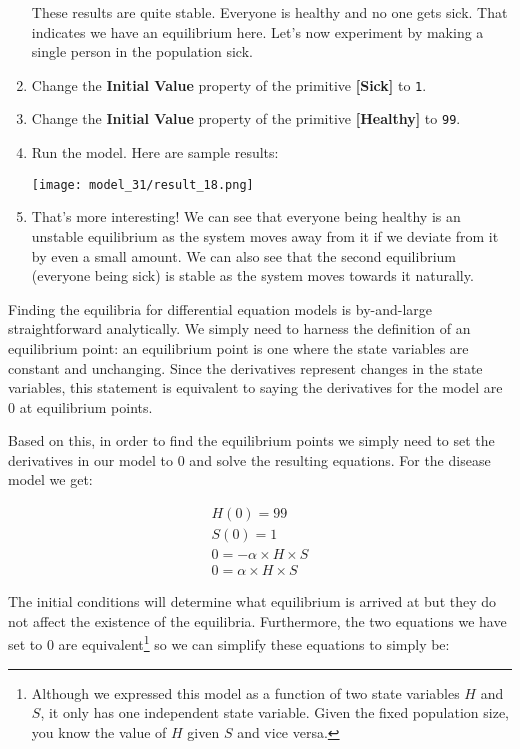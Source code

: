\documentclass[]{memoir}
\makeatletter
\def\maxwidth{\ifdim\Gin@nat@width>\linewidth\linewidth
\else\Gin@nat@width\fi}
\let\Oldincludegraphics\includegraphics
\renewcommand{\includegraphics}[1]{\Oldincludegraphics[width=\maxwidth]{#1}}
\newcommand{\p}[1]{\textbf{{[}#1{]}}}
\newcommand{\e}[1]{\texttt{#1}}
\renewcommand{\a}[1]{\textbf{#1}}
\makeatother
\begin{document}
\begin{oframed}
\begin{enumerate}
These results are quite stable. Everyone is healthy and no one gets sick. That indicates we have an equilibrium here. Let's now experiment by making a single person in the population sick.


\item  Change the \a{Initial Value} property of the primitive \p{Sick} to \e{1}.
\item  Change the \a{Initial Value} property of the primitive \p{Healthy} to \e{99}.
\item Run the model. Here are sample results:\par \begin{minipage}{\linewidth}  \centering \texttt{[image: model\_31/result\_18.png]}
\end{minipage}
\item 

That's more interesting! We can see that everyone being healthy is an unstable equilibrium as the system moves away from it if we deviate from it by even a small amount. We can also see that the second equilibrium (everyone being sick) is stable as the system moves towards it naturally.



\end{enumerate} \end{oframed}

Finding the equilibria for differential equation models is by-and-large
straightforward analytically. We simply need to harness the definition
of an equilibrium point: an equilibrium point is one where the state
variables are constant and unchanging. Since the derivatives represent
changes in the state variables, this statement is equivalent to saying
the derivatives for the model are 0 at equilibrium points.

Based on this, in order to find the equilibrium points we simply need to
set the derivatives in our model to 0 and solve the resulting equations.
For the disease model we get:

\[
\begin{aligned}
H(0) = 99 \\
S(0) = 1 \\
0 = - \alpha \times H \times S \\ 
0 = \alpha \times H \times S
\end{aligned}
\]

The initial conditions will determine what equilibrium is arrived at but
they do not affect the existence of the equilibria. Furthermore, the two
equations we have set to 0 are equivalent\footnote{Although we expressed
  this model as a function of two state variables $H$ and $S$, it only
  has one independent state variable. Given the fixed population size,
  you know the value of $H$ given $S$ and vice versa.} so we can
simplify these equations to simply be:
\end{document}
